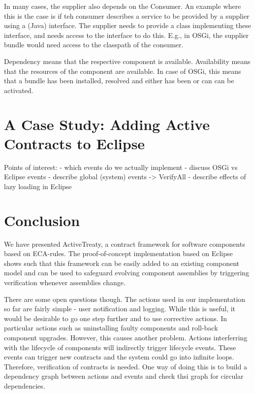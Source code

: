 \documentclass{llncs}
\begin{document}
In many cases, the supplier also depends on the Consumer. An example where this is the case is if teh consumer describes a service to be provided by a supplier using a (Java) interface. The supplier needs to provide a class implementing these interface, and needs access to the interface to do this. E.g., in OSGi, the supplier bundle would need access to the classpath of the consumer. 

Dependency means that the respective component is available. Availability means that the resources of the component are available. In case of OSGi, this means that a bundle has been installed, resolved and either has been or can can be activated. 



\section{A Case Study: Adding Active Contracts to Eclipse}


Points of interest:
- which events do we actually implement
- discuss OSGi vs Eclipse events
- describe global (system) events -> VerifyAll
- describe effects of lazy loading in Eclipse


\section{Conclusion}


We have presented ActiveTreaty, a contract framework for software components based on ECA-rules. The proof-of-concept implementation based on Eclipse shows such that this framework can be easily added to an existing component model and can be used to safeguard evolving component assemblies by triggering verification whenever assemblies change. 

There are some open questions though. The actions used in our implementation so far are fairly simple - user notification and logging. While this is useful, it would be desirable to go one step further and to use corrective actions.  In particular actions such as uninstalling faulty components and roll-back component upgrades. However, this causes another problem. Actions interferring with the lifecycle of components will indirectly trigger lifecycle events. These events can trigger new contracts and the system could go into infinite loops. Therefore, verification of contracts is needed. One way of doing this is to build a dependency graph between actions and events and check thsi graph for circular dependencies. 
\end{document}
